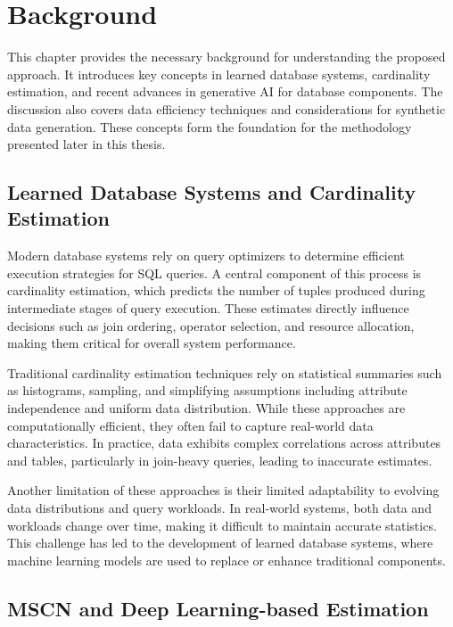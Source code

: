 \chapter{Background}
\label{chap:background}
\pagestyle{plain}

This chapter provides the necessary background for understanding the proposed approach. It introduces key concepts in learned database systems, cardinality estimation, and recent advances in generative AI for database components. The discussion also covers data efficiency techniques and considerations for synthetic data generation. These concepts form the foundation for the methodology presented later in this thesis.

\section{Learned Database Systems and Cardinality Estimation}

Modern database systems rely on query optimizers to determine efficient execution strategies for SQL queries. A central component of this process is cardinality estimation, which predicts the number of tuples produced during intermediate stages of query execution. These estimates directly influence decisions such as join ordering, operator selection, and resource allocation, making them critical for overall system performance.

Traditional cardinality estimation techniques rely on statistical summaries such as histograms, sampling, and simplifying assumptions including attribute independence and uniform data distribution. While these approaches are computationally efficient, they often fail to capture real-world data characteristics. In practice, data exhibits complex correlations across attributes and tables, particularly in join-heavy queries, leading to inaccurate estimates.

Another limitation of these approaches is their limited adaptability to evolving data distributions and query workloads. In real-world systems, both data and workloads change over time, making it difficult to maintain accurate statistics. This challenge has led to the development of learned database systems, where machine learning models are used to replace or enhance traditional components.

\section{MSCN and Deep Learning-based Estimation}

